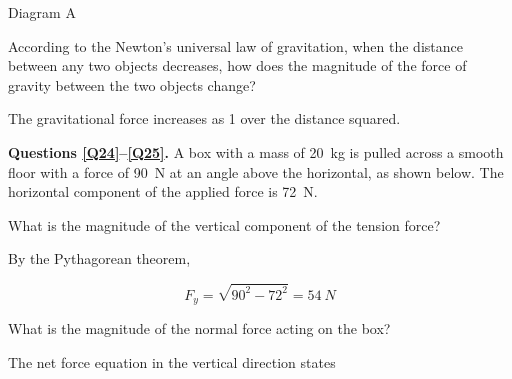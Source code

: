 \documentclass[answers]{exam}
\begin{document}
\begin{questions}
\begin{solution}
    Diagram A
\end{solution}


\question
According to the Newton's universal law of gravitation, when the distance between any two objects decreases, how does the magnitude of the force of gravity between the two objects change?

\ifprintanswers
\else
\fillwithlines{2cm}
\fi

\begin{solution}
    The gravitational force increases as 1 over the distance squared.
\end{solution}



\begin{EnvUplevel}
    \textbf{Questions \ref{Q24}--\ref{Q25}.}  A box with a mass of \SI{20}{kg} is pulled across a smooth floor with a force of \SI{90}{N} at an angle above the horizontal, as shown below. The horizontal component of the applied force is \SI{72}{N}.
\end{EnvUplevel}

\begin{center}
\end{center}

\question \label{Q24}
What is the magnitude of the vertical component of the tension force?

\begin{solution}
By the Pythagorean theorem,

\begin{equation*}
    F_y = \sqrt{90^2 - 72^2} = \boxed{\SI{54}{N}}
\end{equation*}
\end{solution}


\question \label{Q25}
What is the magnitude of the normal force acting on the box?

\begin{solution}
The net force equation in the vertical direction states


\end{solution}
\end{questions}
\end{document}
